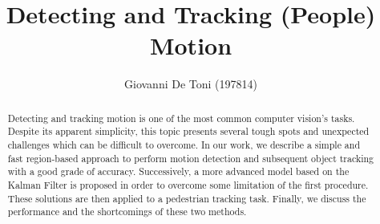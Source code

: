 \documentclass[runningheads]{llncs}
\begin{document}
%
\title{Detecting and Tracking (People) Motion}
%
%
\author{Giovanni De Toni (197814)}
%
%
%
\maketitle              %
%
\begin{abstract}
Detecting and tracking motion is one of the most common computer vision's tasks. Despite its apparent simplicity, this topic presents several tough spots and unexpected challenges which can be difficult to overcome. In our work, we describe a simple and fast region-based approach to perform motion detection and subsequent object tracking with a good grade of accuracy. Successively, a more advanced model based on the Kalman Filter is proposed in order to overcome some limitation of the first procedure. These solutions are then applied to a pedestrian tracking task. Finally, we discuss the performance and the shortcomings of these two methods.

\end{abstract}
%
%
%
\end{document}
